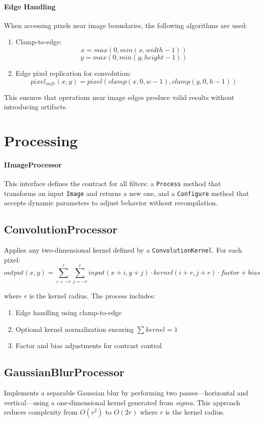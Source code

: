 \documentclass[12pt,a4paper]{report}
\begin{document}
\paragraph{Edge Handling}
When accessing pixels near image boundaries, the following algorithms are used:
\begin{enumerate}
    \item Clamp-to-edge:
    \[ x = max(0, min(x, width-1)) \]
    \[ y = max(0, min(y, height-1)) \]
    
    \item Edge pixel replication for convolution:
    \[ pixel_{safe}(x,y) = pixel(clamp(x,0,w-1), clamp(y,0,h-1)) \]
\end{enumerate}

This ensures that operations near image edges produce valid results without introducing artifacts.

\section{Processing}

\paragraph{IImageProcessor}
This interface defines the contract for all filters: a \texttt{Process} method that transforms an input \texttt{Image} and returns a new one, and a \texttt{Configure} method that accepts dynamic parameters to adjust behavior without recompilation.

\subsection{ConvolutionProcessor}
Applies any two-dimensional kernel defined by a \texttt{ConvolutionKernel}. For each pixel:
\[ output(x,y) = \sum_{i=-r}^r \sum_{j=-r}^r input(x+i,y+j) \cdot kernel(i+r,j+r) \cdot factor + bias \]

where $r$ is the kernel radius. The process includes:
\begin{enumerate}
    \item Edge handling using clamp-to-edge
    \item Optional kernel normalization ensuring $\sum kernel = 1$
    \item Factor and bias adjustments for contrast control
\end{enumerate}

\subsection{GaussianBlurProcessor}
Implements a separable Gaussian blur by performing two passes—horizontal and vertical—using a one-dimensional kernel generated from \textit{sigma}. This approach reduces complexity from $O(r^2)$ to $O(2r)$ where $r$ is the kernel radius.
\end{document}
